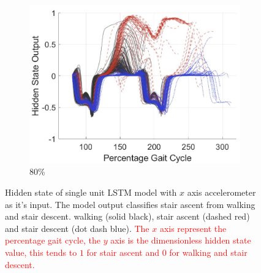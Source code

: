 \documentclass[sensors,article,submit,moreauthors,pdftex]{Definitions/mdpi}
\begin{document}
\begin{figure}[!hbt]
     \begin{subfigure}[b]{0.32\textwidth}
         \centering
         \includegraphics[width=\textwidth]{Figures/results/hidden_state/gyro_y_sa_v_w-sd/80_Participant_04.jpg}
         \caption{80\%}
         \label{subfig:gyro_y_w_v_sa_sd_80}
     \end{subfigure}
    \caption{Hidden state of single unit LSTM model with $x$ axis accelerometer as it's input. The model output classifies stair ascent from walking and stair descent. walking (solid black), stair ascent (dashed red) and stair descent (dot dash blue). \textcolor{red}{The $x$ axis represent the percentage gait cycle, the $y$ axis is the dimensionless hidden state value, this tends to $1$ for stair ascent and $0$ for walking and stair descent.}}
    \label{fig:hidden-state-gyro-y-w_v_sa-sd}
\end{figure}
\end{document}
